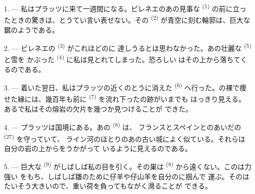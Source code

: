 %

\VUsaut{4.0mm}
\VUsaut{3.0mm}

\VUsaut{3.0mm}

\VUsaut{3.0mm}

1. --- 私はプラッツに来て一週間になる。ピレネエのあの見事な
\textsuperscript{(1)} の前に立ったときの驚きは、とうてい言い表せない。その
 \textsuperscript{(2)} が青空に刻む輪郭は、巨大な鋸のようである。

2. --- ピレネエの \textsuperscript{(3)} がこれほどのに
達しうるとは思わなかった。あの壮麗な \textsuperscript{(5)} と雪を
かぶった \textsuperscript{(4)} に私は見とれてしまった。恐ろしい
はその上から落ちてくるのである。

\VUsaut{3.0mm}
\VUsaut{3.0mm}

3. --- 着いた翌日、私はプラッツの近くのとうに消えた
\textsuperscript{(6)} へ行った。の裸で痩せた縁には、幾百年も前に
 \textsuperscript{(7)} を流れ下ったの跡がいまでも
はっきり見える。あるで私はその熔岩の欠片を幾つか見つけることが
できた。

4. --- プラッツは国境にある。あの \textsuperscript{(8)} は、
フランスとスペインとのあいだの \textsuperscript{(27)} を守っていて、
ライン河のほとりのあの古い城によく似ている。それらは自分の岩の上からをうかがって
いるように見えるのである。

5. --- 巨大な \textsuperscript{(9)} がしばしば私の目を引く。その巣は
 \textsuperscript{(8)} から遠くない。このは力強い
をもち、しばしば雛のために仔羊や仔山羊を自分のに掴んで
運ぶ。そのはたいそう大きいので、重い荷を負ってもながく滑ることが
できる。

\VUsaut{3.0mm}
\VUsaut{3.0mm}

